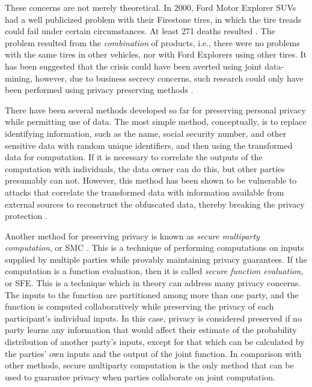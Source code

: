 These concerns are not merely theoretical. In 2000, Ford Motor Explorer
SUVs had a well publicized problem with their Firestone tires, in
which the tire treads could fail under certain circumstances. At least
271 deaths resulted \cite{NYTFordFirestone}. The problem resulted
from the \emph{combination} of products, i.e., there were no problems with
the same tires in other vehicles, nor with Ford Explorers using other
tires. It has been suggested that the crisis could have been averted
using joint data-mining, however, due to business secrecy concerns,
such research could only have been performed using privacy preserving methods
\cite{VaidyaClifton:2002}.

There have been several methods developed so far for preserving personal
privacy while permitting use of data. The most simple method, conceptually,
is to replace identifying information, such as the name, social security
number, and other sensitive data with random unique identifiers, and
then using the transformed data for computation. If it is necessary
to correlate the outputs of the computation with individuals, the
data owner can do this, but other parties presumably can not. However,
this method has been shown to be vulnerable to attacks that correlate
the transformed data with information available from external sources
to reconstruct the obfuscated data, thereby breaking the privacy protection
\cite{Malin04}. 

Another method for preserving privacy is known as \emph{secure multiparty
computation}, or SMC \cite{Yao86}. This is a technique of performing computations on inputs
supplied by multiple parties while provably maintaining privacy guarantees.
If the computation is a function evaluation, then it is called \emph{secure
function evaluation}, or SFE. This is a technique which in theory can address
many privacy concerns. The inputs to
the function are partitioned among more than one party, and the function
is computed collaboratively while preserving the privacy of each participant's
individual inputs. In this case, privacy is considered preserved if
no party learns any information that would affect their estimate of
the probability distribution of another party's inputs, except for
that which can be calculated by the parties' own inputs and the output
of the joint function. In comparison with other methods, secure
multiparty computation is the only method that can be used to guarantee privacy when parties
collaborate on joint computation. %
\begin{comment}
%
\begin{lyxgreyedout}
Needs clarification
\end{lyxgreyedout}
 In other words, the entropy gain of each party is equivalent to the
entropy gain in an idealized protocol where a trusted third party
collects all the inputs, evaluates the function, and transmits only
the output to each party. Depending on the protocol, the guarantees
for some parties may be based on typical assumptions of computational
hardness, while the guarantees for other parties may be information
theoretic.
\end{comment}
{}


